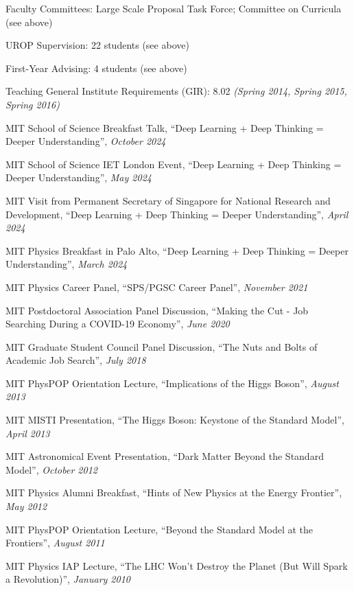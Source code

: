 \item Faculty Committees: Large Scale Proposal Task Force; Committee on Curricula (see above) 
\item UROP Supervision: 22 students (see above) 
\item First-Year Advising: 4 students (see above) 
\item Teaching General Institute Requirements (GIR):  8.02 \emph{(Spring 2014, Spring 2015, Spring 2016)}
\item MIT School of Science Breakfast Talk, ``Deep Learning + Deep Thinking = Deeper Understanding'', \emph{October 2024}
\item MIT School of Science IET London Event, ``Deep Learning + Deep Thinking = Deeper Understanding'', \emph{May 2024}
\item MIT Visit from Permanent Secretary of Singapore for National Research and Development, ``Deep Learning + Deep Thinking = Deeper Understanding'', \emph{April 2024}
\item MIT Physics Breakfast in Palo Alto, ``Deep Learning + Deep Thinking = Deeper Understanding'', \emph{March 2024}
\item MIT Physics Career Panel, ``SPS/PGSC Career Panel'', \emph{November 2021}
\item MIT Postdoctoral Association Panel Discussion, ``Making the Cut - Job Searching During a COVID-19 Economy'', \emph{June 2020}
\item MIT Graduate Student Council Panel Discussion, ``The Nuts and Bolts of Academic Job Search'', \emph{July 2018}
\item MIT PhysPOP Orientation Lecture, ``Implications of the Higgs Boson'', \emph{August 2013}
\item MIT MISTI Presentation, ``The Higgs Boson: Keystone of the Standard Model'', \emph{April 2013}
\item MIT Astronomical Event Presentation, ``Dark Matter Beyond the Standard Model'', \emph{October 2012}
\item MIT Physics Alumni Breakfast, ``Hints of New Physics at the Energy Frontier'', \emph{May 2012}
\item MIT PhysPOP Orientation Lecture, ``Beyond the Standard Model at the Frontiers'', \emph{August 2011}
\item MIT Physics IAP Lecture, ``The LHC Won’t Destroy the Planet (But Will Spark a Revolution)'', \emph{January 2010}

